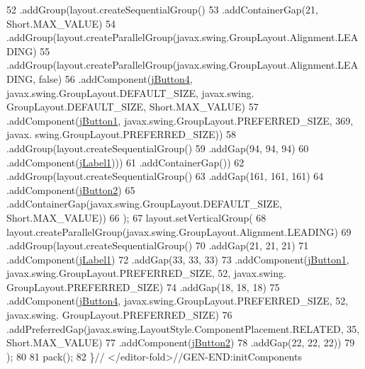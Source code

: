 \begin{DoxyCode}
52             .addGroup(layout.createSequentialGroup()
53                 .addContainerGap(21, Short.MAX\_VALUE)
54                 .addGroup(layout.createParallelGroup(javax.swing.GroupLayout.Alignment.LEADING)
55                     .addGroup(layout.createParallelGroup(javax.swing.GroupLayout.Alignment.LEADING, \textcolor{keyword}{false})
56                         .addComponent(\mbox{\hyperlink{classinterfacessoguar_1_1cu1314_abd74ab1c366767481493ee8d70c7e779}{jButton4}}, javax.swing.GroupLayout.DEFAULT\_SIZE, javax.swing.
      GroupLayout.DEFAULT\_SIZE, Short.MAX\_VALUE)
57                         .addComponent(\mbox{\hyperlink{classinterfacessoguar_1_1cu1314_a604ecb1ce37ecd98c2325309ac0aea23}{jButton1}}, javax.swing.GroupLayout.PREFERRED\_SIZE, 369, javax.
      swing.GroupLayout.PREFERRED\_SIZE))
58                     .addGroup(layout.createSequentialGroup()
59                         .addGap(94, 94, 94)
60                         .addComponent(\mbox{\hyperlink{classinterfacessoguar_1_1cu1314_ababc8bdd3ad91398cdd0c7444b230996}{jLabel1}})))
61                 .addContainerGap())
62             .addGroup(layout.createSequentialGroup()
63                 .addGap(161, 161, 161)
64                 .addComponent(\mbox{\hyperlink{classinterfacessoguar_1_1cu1314_ac2c3897829fe6bdfbec2d57df61549bf}{jButton2}})
65                 .addContainerGap(javax.swing.GroupLayout.DEFAULT\_SIZE, Short.MAX\_VALUE))
66         );
67         layout.setVerticalGroup(
68             layout.createParallelGroup(javax.swing.GroupLayout.Alignment.LEADING)
69             .addGroup(layout.createSequentialGroup()
70                 .addGap(21, 21, 21)
71                 .addComponent(\mbox{\hyperlink{classinterfacessoguar_1_1cu1314_ababc8bdd3ad91398cdd0c7444b230996}{jLabel1}})
72                 .addGap(33, 33, 33)
73                 .addComponent(\mbox{\hyperlink{classinterfacessoguar_1_1cu1314_a604ecb1ce37ecd98c2325309ac0aea23}{jButton1}}, javax.swing.GroupLayout.PREFERRED\_SIZE, 52, javax.swing.
      GroupLayout.PREFERRED\_SIZE)
74                 .addGap(18, 18, 18)
75                 .addComponent(\mbox{\hyperlink{classinterfacessoguar_1_1cu1314_abd74ab1c366767481493ee8d70c7e779}{jButton4}}, javax.swing.GroupLayout.PREFERRED\_SIZE, 52, javax.swing.
      GroupLayout.PREFERRED\_SIZE)
76                 .addPreferredGap(javax.swing.LayoutStyle.ComponentPlacement.RELATED, 35, Short.MAX\_VALUE)
77                 .addComponent(\mbox{\hyperlink{classinterfacessoguar_1_1cu1314_ac2c3897829fe6bdfbec2d57df61549bf}{jButton2}})
78                 .addGap(22, 22, 22))
79         );
80 
81         pack();
82     \}\textcolor{comment}{// </editor-fold>//GEN-END:initComponents}
\end{DoxyCode}
\mbox{\label{classinterfacessoguar_1_1cu1314_a465bd6e52f03d22115cba1995f1b6902}} 
